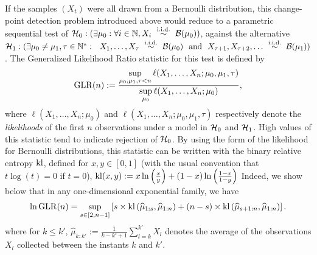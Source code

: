 If the samples $(X_t)$ were all drawn from a Bernoulli distribution, this change-point detection problem introduced above would reduce to a parametric sequential test of
$\cH_0 : (\exists \mu_0: \forall i\in\N, X_i \ \overset{\text{i.i.d.}}{\sim} \ \cB(\mu_0))$,
against the alternative
$\cH_1 : (\exists \mu_0 \neq \mu_1, \tau \in \N^*: \ \  X_1, \ldots, X_\tau \ \overset{\text{i.i.d.}}{\sim} \ \cB(\mu_0) \ \ \text{and} \ \ X_{\tau+1}, X_{\tau+2}, \ldots \ \overset{\text{i.i.d.}}{\sim} \ \cB(\mu_1))$.
%
The Generalized Likelihood Ratio statistic for this test is defined by
\begin{equation}\label{eq:6:firstDefGLRT}
    \mathrm{GLR}(n) :=\frac{\sup\limits_{\mu_0,\mu_1,\tau < n}\ell(X_1, \ldots, X_n ; \mu_0,\mu_1,\tau)}{\sup\limits_{\mu_0}\ell(X_1, \ldots, X_n ; \mu_0)},
\end{equation}
%
where $\ell(X_1, \ldots, X_n ; \mu_0)$ and $\ell(X_1, \ldots, X_n ; \mu_0,\mu_1,\tau)$ respectively denote the \emph{likelihoods} of the first $n$ observations under a model in $\mathcal{H}_0$ and $\mathcal{H}_1$.
High values of this statistic tend to indicate rejection of $\mathcal{H}_0$.
%
By using the form of the likelihood for Bernoulli distributions, this statistic can be written with the binary relative entropy $\mathrm{kl}$, defined for $x,y\in[0,1]$ (with the usual convention that $t \log(t) = 0$ if $t=0$),
$\mathrm{kl}(x,y) := x \ln\left(\frac{x}{y}\right) + (1-x)\ln\left(\frac{1-x}{1-y}\right)$
%
Indeed, we show below
that in any one-dimensional exponential family, we have
\begin{equation}\label{eq:6:secondDefGLRT}
    \ln \mathrm{GLR}(n) = \sup_{s \in [2,n-1]} \left[s \times \mathrm{kl}\left(\widehat{\mu}_{1:s},\widehat{\mu}_{1:n}\right) + (n-s) \times \mathrm{kl}\left(\widehat{\mu}_{s+1:n},\widehat{\mu}_{1:n}\right)\right].
\end{equation}
%
where for $k \leq k'$, $\widehat{\mu}_{k:k'} := \frac{1}{k - k' + 1} \sum\limits_{l=k}^{k'} X_l$ denotes the average of the observations $X_l$ collected between the instants $k$ and $k'$.


